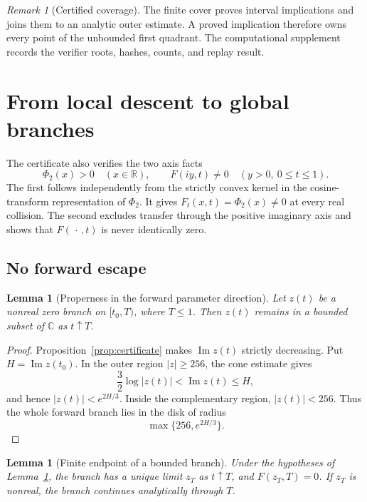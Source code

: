 \documentclass[11pt,a4paper]{amsart}
\newtheorem{lemma}[theorem]{Lemma}
\theoremstyle{definition}
\theoremstyle{remark}
\newtheorem{remark}[theorem]{Remark}
\newcommand{\C}{\mathbb C}
\newcommand{\R}{\mathbb R}
\newcommand{\PhiTwo}{\Phi_{2}}
\begin{document}
\begin{remark}[Certified coverage]
The finite cover proves interval implications and joins them to an analytic
outer estimate.  A proved implication therefore owns every point of the
unbounded first quadrant.  The computational supplement records the verifier
roots, hashes, counts, and replay result.
\end{remark}

\section{From local descent to global branches}\label{sec:global}

The certificate also verifies the two axis facts
\begin{equation}\label{eq:real-axis-facts}
  \PhiTwo(x)>0\quad(x\in\R),
  \qquad
  F(iy,t)\neq0\quad(y>0,\ 0\leq t\leq1).
\end{equation}
The first follows independently from the strictly convex kernel in the
cosine-transform representation of $\PhiTwo$.  It gives
$F_t(x,t)=\PhiTwo(x)\neq0$ at every real collision.  The second excludes
transfer through the positive imaginary axis and shows that
$F(\,\cdot\,,t)$ is never identically zero.

\subsection{No forward escape}

\begin{lemma}[Properness in the forward parameter direction]\label{lem:proper}
Let $z(t)$ be a nonreal zero branch on $[t_0,T)$, where $T\leq1$.  Then $z(t)$ remains in a bounded subset of $\C$ as $t\uparrow T$.
\end{lemma}

\begin{proof}
Proposition~\ref{prop:certificate} makes $\operatorname{Im}z(t)$ strictly
decreasing.  Put $H=\operatorname{Im}z(t_0)$.  In the outer region
$|z|\geq256$, the cone estimate gives
\[
  \frac32\log|z(t)|<\operatorname{Im}z(t)\leq H,
\]
and hence $|z(t)|<e^{2H/3}$.  Inside the complementary region, $|z(t)|<256$.  Thus the whole forward branch lies in the disk of radius
\[
  \max\{256,e^{2H/3}\}.
\]
\end{proof}

\begin{lemma}[Finite endpoint of a bounded branch]\label{lem:endpoint}
Under the hypotheses of Lemma~\ref{lem:proper}, the branch has a unique limit
$z_T$ as $t\uparrow T$, and $F(z_T,T)=0$.  If $z_T$ is nonreal, the branch
continues analytically through $T$.
\end{lemma}
\end{document}
